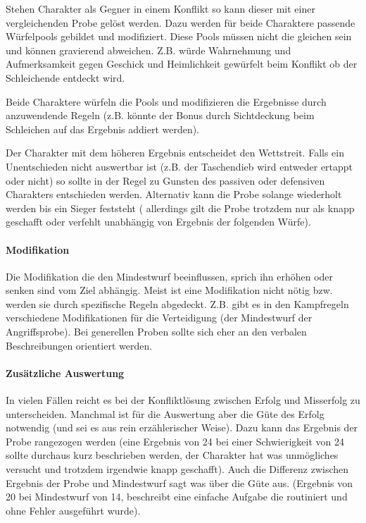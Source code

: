 \documentclass{article}
\begin{document}
Stehen Charakter als Gegner in einem Konflikt so kann dieser mit einer vergleichenden Probe gelöst werden. Dazu
werden für beide Charaktere passende Würfelpools gebildet und modifiziert. Diese Pools müssen nicht die gleichen
sein und können gravierend abweichen. Z.B. würde Wahrnehmung und Aufmerksamkeit gegen Geschick und Heimlichkeit
gewürfelt beim Konflikt ob der Schleichende entdeckt wird.

Beide Charaktere würfeln die Pools und modifizieren die Ergebnisse durch anzuwendende Regeln (z.B. könnte der Bonus
durch Sichtdeckung beim Schleichen auf das Ergebnis addiert werden).

Der Charakter mit dem höheren Ergebnis entscheidet den Wettstreit. Falls ein Unentschieden nicht auswertbar ist (z.B.
der Taschendieb wird entweder ertappt oder nicht) so sollte in der Regel zu Gunsten des passiven oder defensiven
Charakters entschieden werden. Alternativ kann die Probe solange wiederholt werden bis ein Sieger feststeht (
allerdings gilt die Probe trotzdem nur als knapp geschafft oder verfehlt unabhängig von Ergebnis der folgenden Würfe).

\paragraph{Modifikation}

Die Modifikation die den Mindestwurf beeinflussen, sprich ihn erhöhen oder senken sind vom Ziel abhängig.
Meist ist eine Modifikation nicht nötig bzw. werden sie durch spezifische Regeln abgedeckt. Z.B. gibt es in den
Kampfregeln verschiedene Modifikationen für die Verteidigung (der Mindestwurf der Angriffsprobe). Bei generellen
Proben sollte sich eher an den verbalen Beschreibungen orientiert werden.

\paragraph{Zusätzliche Auswertung}

In vielen Fällen reicht es bei der Konfliktlösung zwischen Erfolg und Misserfolg zu unterscheiden. Manchmal ist
für die Auswertung aber die Güte des Erfolg notwendig (und sei es aus rein erzählerischer Weise). Dazu kann das
Ergebnis der Probe rangezogen werden (eine Ergebnis von 24 bei einer Schwierigkeit von 24 sollte durchaus kurz
beschrieben werden, der Charakter hat was unmögliches versucht und trotzdem irgendwie knapp geschafft). Auch die
Differenz zwischen Ergebnis der Probe und Mindestwurf sagt was über die Güte aus. (Ergebnis von 20 bei Mindestwurf
von 14, beschreibt eine einfache Aufgabe die routiniert und ohne Fehler ausgeführt wurde).
\end{document}
